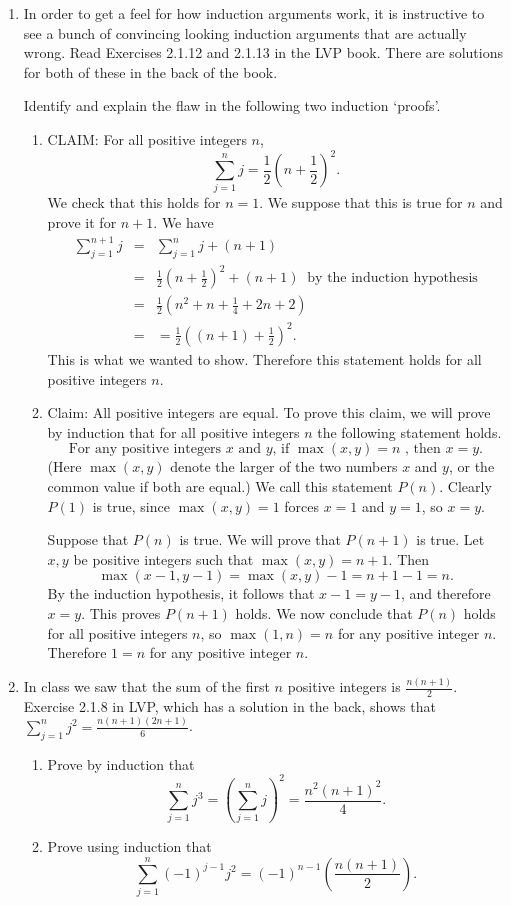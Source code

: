 \documentclass[11pt]{article}
\begin{document}
\begin{enumerate}
\item In order to get a feel for how induction arguments work, it is instructive to see a bunch of convincing looking induction arguments that are actually wrong.  Read Exercises 2.1.12 and 2.1.13 in the LVP book.  There are solutions for both of these in the back of the book.  


Identify and explain the flaw in the following two induction `proofs'.
\begin{enumerate}
\item CLAIM: For all positive integers $n$,
\[ 
\sum_{j=1}^n j = \frac{1}{2} \left(n+\frac{1}{2}\right)^2.
\]
We check that this holds for $n=1$.  We suppose that this is true for $n$ and prove it for $n+1$.  We have
\begin{eqnarray*} 
\sum_{j=1}^{n+1} j & = &  \sum_{j=1}^n j + (n+1) \\
& = & \frac{1}{2} \left(n+\frac{1}{2}\right)^2 + (n+1)\ \text{ by the induction hypothesis} \\
& = & \frac{1}{2}\left(n^2 + n +\frac{1}{4} + 2n+2\right) \\
& = & = \frac{1}{2} \left( (n+1) + \frac{1}{2} \right)^2.
\end{eqnarray*}
This is what we wanted to show.  Therefore this statement holds for all positive integers $n$.

\item Claim: All positive integers are equal.  To prove this claim, we will prove by induction that for all positive integers $n$ the following statement holds.
\[
\text{For any positive integers } x \text{ and } y \text{, if } \max(x,y) = n \text{ , then } x=y.
\]
(Here $\max(x,y)$ denote the larger of the two numbers $x$ and $y$, or the common value if both are equal.)  We call this statement $P(n)$.  Clearly $P(1)$ is true, since $\max(x,y) = 1$ forces $x=1$ and $y=1$, so $x=y$.

Suppose that $P(n)$ is true.  We will prove that $P(n+1)$ is true.  Let $x,y$ be positive integers such that $\max(x,y) = n+1$.  Then 
\[
\max(x-1,y-1) = \max(x,y) -1 = n+1-1 = n.
\]
By the induction hypothesis, it follows that $x-1 = y-1$, and therefore $x=y$.  This proves $P(n+1)$ holds.  We now conclude that $P(n)$ holds for all positive integers $n$, so $\max(1,n) = n$ for any positive integer $n$. Therefore $1=n$ for any positive integer $n$.

\end{enumerate}



\item  In class we saw that the sum of the first $n$ positive integers is $\frac{n(n+1)}{2}$.  Exercise 2.1.8 in LVP, which has a solution in the back, shows that $\sum_{j=1}^n  j^2 = \frac{n(n+1)(2n+1)}{6}$. 
\begin{enumerate}
\item Prove by induction that 
\[
\sum_{j=1}^n j^3 = \left( \sum_{j=1}^n j \right)^2 = \frac{n^2 (n+1)^2}{4}.
\]
\item Prove using induction that 
\[
\sum_{j=1}^n (-1)^{j-1} j^2 = (-1)^{n-1} \left(\frac{n(n+1)}{2}\right).
\]
\end{enumerate}


\end{enumerate}
\end{document}
